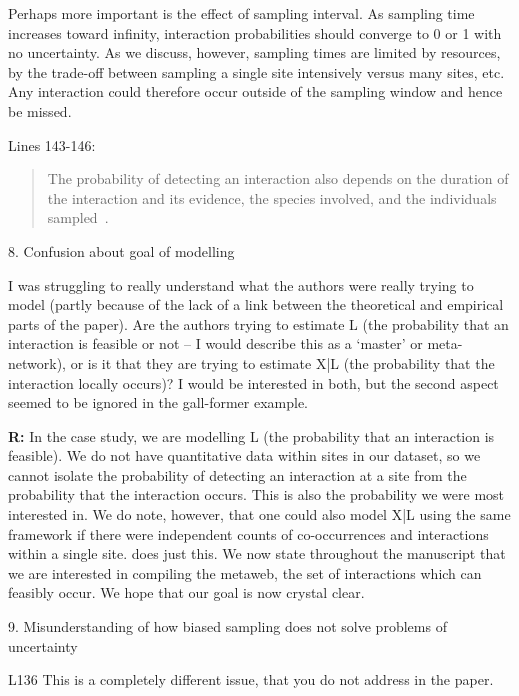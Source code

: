 \documentclass[12pt]{letter}
\newenvironment{refquote}{\bigskip \begin{it}}{\end{it}\smallskip}
\begin{document}
		Perhaps more important is the effect of sampling interval. As sampling time increases toward infinity, interaction probabilities should converge to 0 or 1 with no uncertainty. As we discuss, however, sampling times are limited by resources, by the trade-off between sampling a single site intensively versus many sites, etc. Any interaction could therefore occur outside of the sampling window and hence be missed.


		Lines 143-146:


		\begin{quotation}
			The probability of detecting an interaction also depends on the duration of the interaction and its evidence, the species involved, and the individuals sampled~\citep{Wells2013,Lagrue2015,Cirtwill2016,Weinstein2017}. 
		\end{quotation}

	8. Confusion about goal of modelling


		\begin{refquote}
		I was struggling to really understand what the authors were really trying to model (partly because of the lack of a link between the theoretical and empirical parts of the paper). Are the authors trying to estimate L (the probability that an interaction is feasible or not – I would describe this as a `master' or meta- network), or is it that they are trying to estimate X|L (the probability that the interaction locally occurs)? I would be interested in both, but the second aspect seemed to be ignored in the gall-former example.
		\end{refquote}


		\textbf{R:} In the case study, we are modelling L (the probability that an interaction is feasible). We do not have quantitative data within sites in our dataset, so we cannot isolate the probability of detecting an interaction at a site from the probability that the interaction occurs. This is also the probability we were most interested in. We do note, however, that one could also model X|L using the same framework if there were independent counts of co-occurrences and interactions within a single site. \citet{Gravel2018} does just this. We now state throughout the manuscript that we are interested in compiling the metaweb, the set of interactions which can feasibly occur. We hope that our goal is now crystal clear.


	9. Misunderstanding of how biased sampling does not solve problems of uncertainty


		\begin{refquote}
		L136 This is a completely different issue, that you do not address in the paper.
		\end{refquote}
\end{document}
